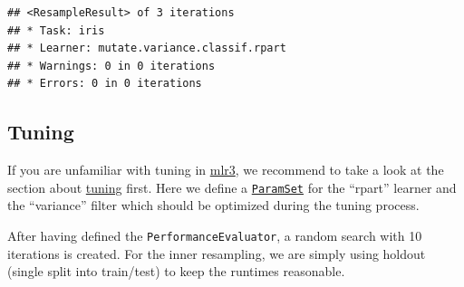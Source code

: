 \documentclass[]{scrbook}
\newenvironment{Shaded}{\begin{snugshade}}{\end{snugshade}}
\newcommand{\DataTypeTok}[1]{\textcolor[rgb]{0.13,0.29,0.53}{#1}}
\newcommand{\DecValTok}[1]{\textcolor[rgb]{0.00,0.00,0.81}{#1}}
\newcommand{\FloatTok}[1]{\textcolor[rgb]{0.00,0.00,0.81}{#1}}
\newcommand{\KeywordTok}[1]{\textcolor[rgb]{0.13,0.29,0.53}{\textbf{#1}}}
\newcommand{\NormalTok}[1]{#1}
\newcommand{\OperatorTok}[1]{\textcolor[rgb]{0.81,0.36,0.00}{\textbf{#1}}}
\newcommand{\StringTok}[1]{\textcolor[rgb]{0.31,0.60,0.02}{#1}}
\renewenvironment{Shaded} {\begin{snugshade}\small} {\end{snugshade}}
\begin{document}
\begin{verbatim}
## <ResampleResult> of 3 iterations
## * Task: iris
## * Learner: mutate.variance.classif.rpart
## * Warnings: 0 in 0 iterations
## * Errors: 0 in 0 iterations
\end{verbatim}

\hypertarget{pipe-tuning}{%
\subsection{Tuning}\label{pipe-tuning}}

If you are unfamiliar with tuning in \href{https://mlr3.mlr-org.com}{mlr3}, we recommend to take a look at the section about \protect\hyperlink{tuning}{tuning} first.
Here we define a \href{https://paradox.mlr-org.com/reference/ParamSet.html}{\texttt{ParamSet}} for the ``rpart'' learner and the ``variance'' filter which should be optimized during the tuning process.

\begin{Shaded}
\end{Shaded}

After having defined the \texttt{PerformanceEvaluator}, a random search with 10 iterations is created.
For the inner resampling, we are simply using holdout (single split into train/test) to keep the runtimes reasonable.

\begin{Shaded}
\end{Shaded}
\end{document}
